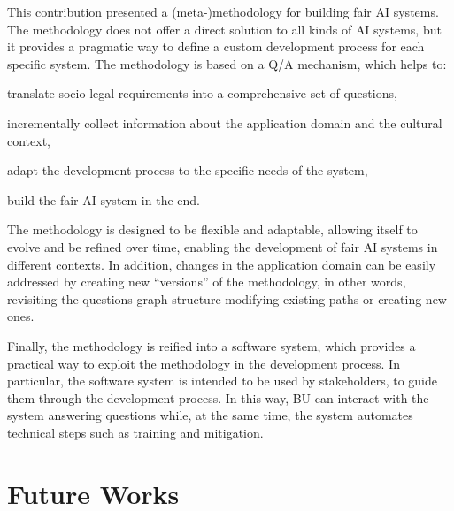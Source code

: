 \documentclass[12pt,a4paper,openright,twoside]{book}
\begin{document}
This contribution presented a (meta-)methodology for building fair \ac{AI} systems.
%
The methodology does not offer a direct solution to all kinds of \ac{AI} systems, but it provides a pragmatic way to define a custom development process for each specific system.
%
The methodology is based on a \ac{Q/A} mechanism, which helps to:
\begin{enumerate*}[label=(\roman*)]
    \item translate socio-legal requirements into a comprehensive set of questions,
    \item incrementally collect information about the application domain and the cultural context,
    \item adapt the development process to the specific needs of the system,
    \item build the fair \ac{AI} system in the end.
\end{enumerate*}
%
The methodology is designed to be flexible and adaptable, allowing itself to evolve and be refined over time, enabling the development of fair \ac{AI} systems in different contexts.
%
In addition, changes in the application domain can be easily addressed by creating new ``versions'' of the methodology, in other words, revisiting the questions graph structure modifying existing paths or creating new ones.

Finally, the methodology is reified into a software system, which provides a practical way to exploit the methodology in the development process.
%
In particular, the software system is intended to be used by stakeholders, to guide them through the development process.
%
In this way, \acl{BU} can interact with the system answering questions while, at the same time, the system automates technical steps such as training and mitigation.
%




\section{Future Works}
\end{document}
